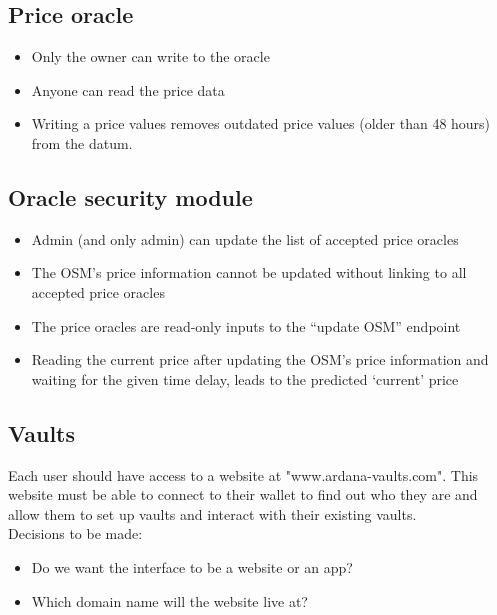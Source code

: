 \documentclass{article} %
\begin{document}
\subsection{Price oracle}

\begin{itemize}
  \item Only the owner can write to the oracle
  \item Anyone can read the price data
  \item Writing a price values removes outdated price values (older than 48
    hours) from the datum.
\end{itemize}

\subsection{Oracle security module}

\begin{itemize}
  \item Admin (and only admin) can update the list of accepted price oracles
  \item The OSM's price information cannot be updated without linking to all
    accepted price oracles
  \item The price oracles are read-only inputs to the ``update OSM'' endpoint
  \item Reading the current price after updating the OSM's price information and
    waiting for the given time delay, leads to the predicted `current' price
\end{itemize}

\subsection{Vaults}

Each user should have access to a website at "www.ardana-vaults.com". This
website must be able to connect to their wallet to find out who they are and
allow them to set up vaults and interact with their existing vaults. \\

Decisions to be made:
\begin{itemize}
  \item Do we want the interface to be a website or an app?
  \item Which domain name will the website live at?
\end{itemize}
\end{document}
